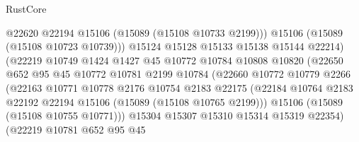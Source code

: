 \begin{lexlean}{RustCore}
\begin{coremodule}
                                    @22620
                                    @22194
                                    @15106
                                    (@15089 (@15108 @10733 @2199)))
                                  @15106
                                  (@15089 (@15108 @10723 @10739)))
                                @15124
                                @15128
                                @15133
                                @15138
                                @15144
                                @22214)
                              (@22219
                                @10749
                                @1424
                                @1427
                                @45
                                @10772
                                @10784
                                @10808
                                @10820
                                (@22650
                                  @652
                                  @95
                                  @45
                                  @10772
                                  @10781
                                  @2199
                                  @10784
                                  (@22660
                                    @10772
                                    @10779
                                    @2266
                                    (@22163
                                      @10771
                                      @10778
                                      @2176
                                      @10754
                                      @2183
                                      @22175
                                      (@22184
                                        @10764
                                        @2183
                                        @22192
                                        @22194
                                        @15106
                                        (@15089 (@15108 @10765 @2199)))
                                      @15106
                                      (@15089 (@15108 @10755 @10771)))
                                    @15304
                                    @15307
                                    @15310
                                    @15314
                                    @15319
                                    @22354)
                                  (@22219
                                    @10781
                                    @652
                                    @95
                                    @45

\end{coremodule}
\end{lexlean}
